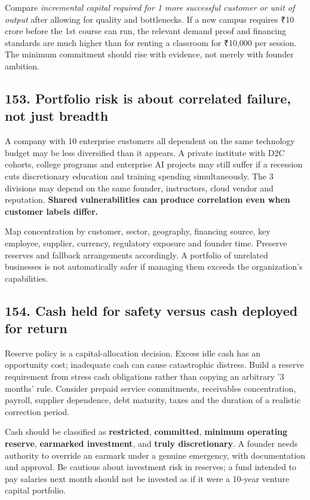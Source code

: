 Compare \textit{incremental capital required for 1 more successful customer or unit of output} after allowing for quality and bottlenecks. If a new campus requires ₹10 crore before the 1st course can run, the relevant demand proof and financing standards are much higher than for renting a classroom for ₹10,000 per session. The minimum commitment should rise with evidence, not merely with founder ambition.

\subsection{153. Portfolio risk is about correlated failure, not just breadth}


A company with 10 enterprise customers all dependent on the same technology budget may be less diversified than it appears. A private institute with D2C cohorts, college programs and enterprise AI projects may still suffer if a recession cuts discretionary education and training spending simultaneously. The 3 divisions may depend on the same founder, instructors, cloud vendor and reputation. \textbf{Shared vulnerabilities can produce correlation even when customer labels differ.}

Map concentration by customer, sector, geography, financing source, key employee, supplier, currency, regulatory exposure and founder time. Preserve reserves and fallback arrangements accordingly. A portfolio of unrelated businesses is not automatically safer if managing them exceeds the organization’s capabilities.

\subsection{154. Cash held for safety versus cash deployed for return}


Reserve policy is a capital-allocation decision. Excess idle cash has an opportunity cost; inadequate cash can cause catastrophic distress. Build a reserve requirement from stress cash obligations rather than copying an arbitrary '3 months' rule. Consider prepaid service commitments, receivables concentration, payroll, supplier dependence, debt maturity, taxes and the duration of a realistic correction period.

Cash should be classified as \textbf{restricted}, \textbf{committed}, \textbf{minimum operating reserve}, \textbf{earmarked investment}, and \textbf{truly discretionary}. A founder needs authority to override an earmark under a genuine emergency, with documentation and approval. Be cautious about investment risk in reserves; a fund intended to pay salaries next month should not be invested as if it were a 10-year venture capital portfolio.

